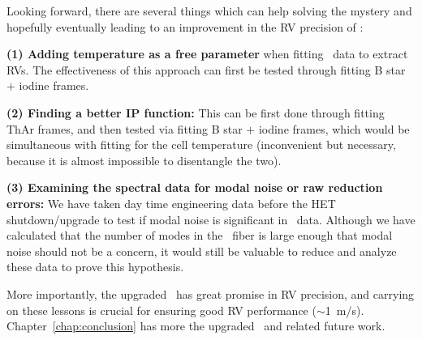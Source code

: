 Looking forward, there are several things which can help solving the
mystery and hopefully eventually leading to an improvement in the RV
precision of \het:

{\bf (1) Adding temperature as a free parameter} when fitting
\het\ data to extract RVs. The effectiveness of this approach can
first be tested through fitting B star $+$ iodine frames. 

{\bf (2) Finding a better IP function:} This can be first done
through fitting ThAr frames, and then tested via fitting B star $+$
iodine frames, which would be simultaneous with fitting for the cell
temperature (inconvenient but necessary, because it is almost
impossible to disentangle the two). 

{\bf (3) Examining the spectral data for modal noise or raw reduction
errors:} We have taken day time engineering data before the HET
shutdown/upgrade to test if modal noise is significant in \het\
data. Although we have calculated that the number of modes in the
\het\ fiber is large enough that modal noise should not be a concern,
it would still be valuable to reduce and analyze these data to prove
this hypothesis.

More importantly, the upgraded \het\ has great promise in RV
precision, and carrying on these lessons is crucial for ensuring good
RV performance ($\sim$1~m/s). Chapter~\ref{chap:conclusion} has more
the upgraded \het\ and related future work.



